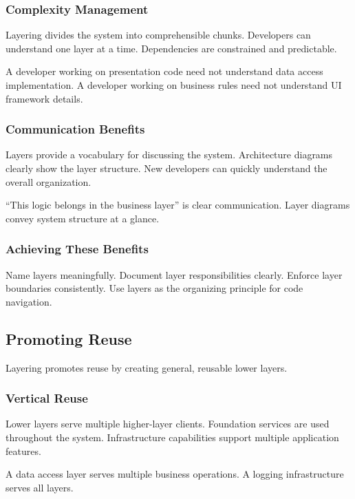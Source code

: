\documentclass[11pt]{article}
\begin{document}
\subsubsection{Complexity Management}

Layering divides the system into comprehensible chunks. Developers can understand one layer at a time. Dependencies are constrained and predictable.

A developer working on presentation code need not understand data access implementation. A developer working on business rules need not understand UI framework details.

\subsubsection{Communication Benefits}

Layers provide a vocabulary for discussing the system. Architecture diagrams clearly show the layer structure. New developers can quickly understand the overall organization.

``This logic belongs in the business layer'' is clear communication. Layer diagrams convey system structure at a glance.

\subsubsection{Achieving These Benefits}

Name layers meaningfully. Document layer responsibilities clearly. Enforce layer boundaries consistently. Use layers as the organizing principle for code navigation.

\subsection{Promoting Reuse}

Layering promotes reuse by creating general, reusable lower layers.

\subsubsection{Vertical Reuse}

Lower layers serve multiple higher-layer clients. Foundation services are used throughout the system. Infrastructure capabilities support multiple application features.

A data access layer serves multiple business operations. A logging infrastructure serves all layers.
\end{document}
